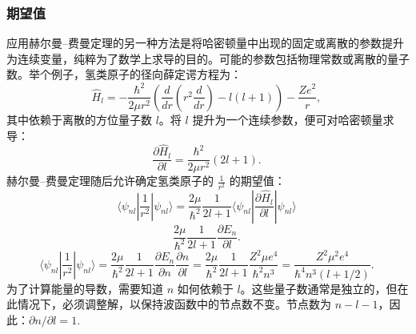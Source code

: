 \subsubsection{期望值}
应用赫尔曼–费曼定理的另一种方法是将哈密顿量中出现的固定或离散的参数提升为连续变量，纯粹为了数学上求导的目的。可能的参数包括物理常数或离散的量子数。举个例子，氢类原子的径向薛定谔方程为：
\[
\hat{H}_l = - \frac{\hbar^2}{2\mu r^2} \left( \frac{d}{dr} \left( r^2 \frac{d}{dr} \right) - l(l+1) \right) - \frac{Ze^2}{r},~
\]
其中依赖于离散的方位量子数 \(l\)。将 \(l\) 提升为一个连续参数，便可对哈密顿量求导：
\[
\frac{\partial \hat{H}_l}{\partial l} = \frac{\hbar^2}{2\mu r^2}(2l+1).~
\]
赫尔曼–费曼定理随后允许确定氢类原子的 \(\frac{1}{r^2}\) 的期望值：
\[
\langle \psi_{nl} \left| \frac{1}{r^2} \right| \psi_{nl} \rangle = \frac{2\mu}{\hbar^2} \frac{1}{2l+1} \langle \psi_{nl} \left| \frac{\partial \hat{H}_l}{\partial l} \right| \psi_{nl} \rangle ~
\]
\[\frac{2\mu}{\hbar^2} \frac{1}{2l+1} \frac{\partial E_n}{\partial l}.~\]
\[
\langle \psi_{nl} \left| \frac{1}{r^2} \right| \psi_{nl} \rangle = \frac{2\mu}{\hbar^2} \frac{1}{2l+1} \frac{\partial E_n}{\partial n} \frac{\partial n}{\partial l} = \frac{2\mu}{\hbar^2} \frac{1}{2l+1} \frac{Z^2 \mu e^4}{\hbar^2 n^3} = \frac{Z^2 \mu^2 e^4}{\hbar^4 n^3 (l + 1/2)}.~
\]
为了计算能量的导数，需要知道 \(n\) 如何依赖于 \(l\)。这些量子数通常是独立的，但在此情况下，必须调整解，以保持波函数中的节点数不变。节点数为 \(n - l - 1\)，因此：\(\partial n/\partial l = 1.\)